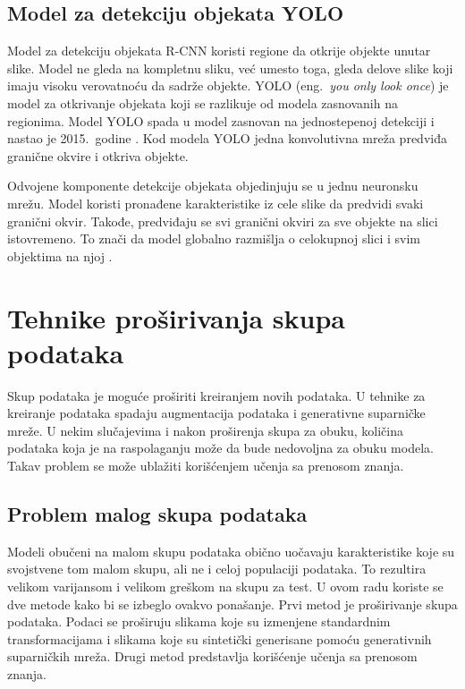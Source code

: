\documentclass[12pt,oneside]{memoir}
\begin{document}
\section{Model za detekciju objekata YOLO}
Model za detekciju objekata R-CNN koristi regione da otkrije objekte unutar slike. Model ne gleda na kompletnu sliku, već umesto toga, gleda delove slike koji imaju visoku verovatnoću da sadrže objekte. YOLO (eng.~\textit{you only look once}) je model za otkrivanje objekata koji se razlikuje od modela zasnovanih na regionima. Model YOLO spada u model zasnovan na jednostepenoj detekciji i nastao je 2015.~godine \cite{redmon2016you}. Kod modela YOLO jedna konvolutivna mreža predviđa granične okvire i otkriva objekte.%

Odvojene komponente detekcije objekata objedinjuju se u jednu neuronsku mrežu. Model koristi pronađene karakteristike iz cele slike da predvidi svaki granični okvir. Takođe, predviđaju se svi granični okviri za sve objekte na slici istovremeno. To znači da model globalno razmišlja o celokupnoj slici i svim objektima na njoj \cite{redmon2016you}.


\chapter{Tehnike proširivanja skupa podataka}
\label{section3}

Skup podataka je moguće proširiti kreiranjem novih podataka. U tehnike za kreiranje podataka spadaju augmentacija podataka i generativne suparničke mreže. U nekim slučajevima i nakon proširenja skupa za obuku, količina podataka koja je na raspolaganju može da bude nedovoljna za obuku modela. Takav problem se može ublažiti korišćenjem učenja sa prenosom znanja. 

\section{Problem malog skupa podataka}

Modeli obučeni na malom skupu podataka obično uočavaju karakteristike koje su svojstvene tom malom skupu, ali ne i celoj populaciji podataka. To rezultira velikom varijansom i velikom greškom na skupu za test. U ovom radu koriste se dve metode kako bi se izbeglo ovakvo ponašanje. Prvi metod je proširivanje skupa podataka.
Podaci se proširuju slikama koje su izmenjene standardnim transformacijama i slikama koje su sintetički generisane pomoću generativnih suparničkih mreža.
Drugi metod predstavlja korišćenje učenja sa prenosom znanja.
\end{document}
